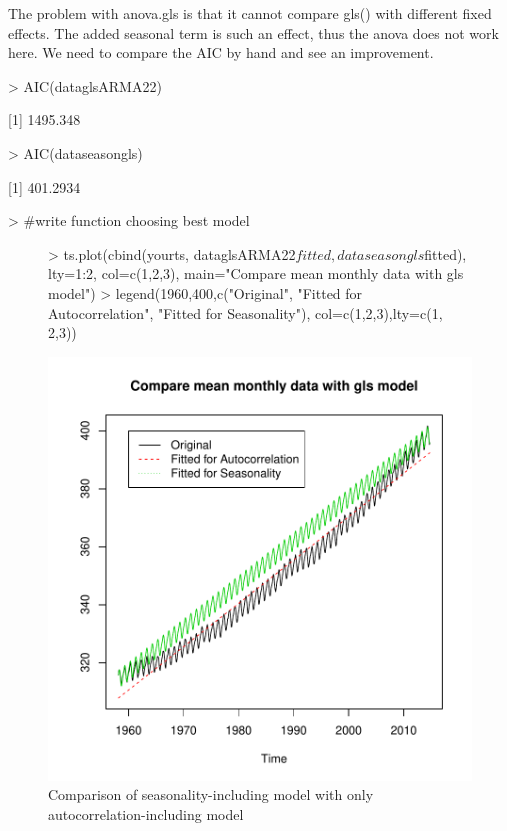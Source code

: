 \documentclass[11pt, a4paper]{article} %
\begin{document}
The problem with anova.gls is that it cannot compare gls() with different fixed effects. The added seasonal term is such an effect, thus the anova does not work here. We need to compare the AIC by hand and see an improvement. 


\begin{Schunk}
\begin{Sinput}
> AIC(dataglsARMA22)
\end{Sinput}
[1] 1495.348\begin{Sinput}
> AIC(dataseasongls)
\end{Sinput}
[1] 401.2934\begin{Sinput}
> #write function choosing best model 
\end{Sinput}
\end{Schunk}

\begin{figure}[H]
\centering
\begin{Schunk}
\begin{Sinput}
> ts.plot(cbind(yourts, dataglsARMA22$fitted,
               dataseasongls$fitted),
         lty=1:2, col=c(1,2,3), 
         main="Compare mean monthly data with gls model")
> legend(1960,400,c("Original",
                   "Fitted for Autocorrelation",
                   "Fitted for Seasonality"),
        col=c(1,2,3),lty=c(1, 2,3))
\end{Sinput}
\end{Schunk}
\includegraphics{alleselena-043}
\caption{Comparison of seasonality-including model with only autocorrelation-including model}
\label{compseas2}
\end{figure}
\end{document}
